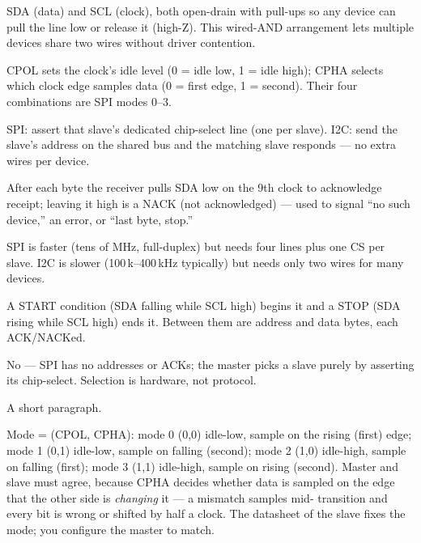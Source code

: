 SDA (data) and SCL (clock), both open-drain with pull-ups so any device can pull
the line low or release it (high-Z). This wired-AND arrangement lets multiple
devices share two wires without driver contention.

CPOL sets the clock's idle level (0 = idle low, 1 = idle high); CPHA selects
which clock edge samples data (0 = first edge, 1 = second). Their four
combinations are SPI modes 0--3.

SPI: assert that slave's dedicated chip-select line (one per slave). I2C: send
the slave's address on the shared bus and the matching slave responds --- no
extra wires per device.

After each byte the receiver pulls SDA low on the 9th clock to acknowledge
receipt; leaving it high is a NACK (not acknowledged) --- used to signal ``no
such device,'' an error, or ``last byte, stop.''

SPI is faster (tens of MHz, full-duplex) but needs four lines plus one CS per
slave. I2C is slower (100\,k--400\,kHz typically) but needs only two wires for
many devices.

A START condition (SDA falling while SCL high) begins it and a STOP (SDA rising
while SCL high) ends it. Between them are address and data bytes, each
ACK/NACKed.

No --- SPI has no addresses or ACKs; the master picks a slave purely by
asserting its chip-select. Selection is hardware, not protocol.

%
{A short paragraph.}

Mode = (CPOL, CPHA): mode 0 (0,0) idle-low, sample on the rising (first) edge;
mode 1 (0,1) idle-low, sample on falling (second); mode 2 (1,0) idle-high,
sample on falling (first); mode 3 (1,1) idle-high, sample on rising (second).
Master and slave must agree, because CPHA decides whether data is sampled on the
edge that the other side is \emph{changing} it --- a mismatch samples mid-
transition and every bit is wrong or shifted by half a clock. The datasheet of
the slave fixes the mode; you configure the master to match.

